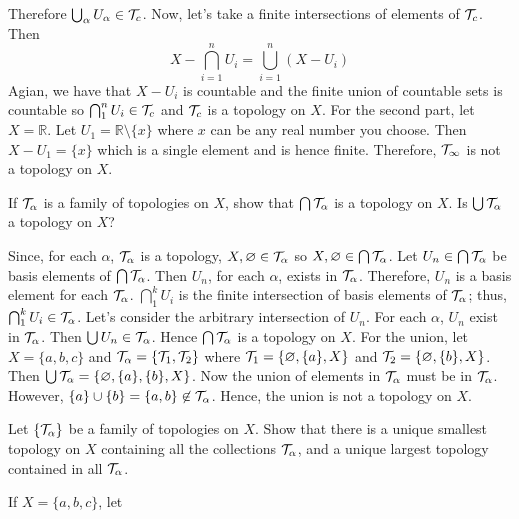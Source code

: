 \begin{exercise}
  Therefore \(\bigcup_{\alpha}U_{\alpha}\in\mathcal{T}_c\).
  Now, let's take a finite intersections of elements of \(\mathcal{T}_c\).
  Then
  \[
  X - \bigcap_{i = 1}^nU_i = \bigcup_{i = 1}^n(X - U_i)
  \]
  Agian, we have that \(X - U_i\) is countable and the finite union of
  countable sets is countable so \(\bigcap_1^nU_i\in\mathcal{T}_c\) and \(\mathcal{T}_c\) is
  a topology on \(X\).
  For the second part, let \(X = \mathbb{R}\).
  Let \(U_1 = \mathbb{R}\setminus\{x\}\) where \(x\) can be any real number you
  choose.
  Then \(X - U_1 = \{x\}\) which is a single element and is hence finite.
  Therefore, \(\mathcal{T}_{\infty}\) is not a topology on \(X\).
\item
  \begin{exercise}[label = (\alph*)]
  \item
    If \(\mathcal{T}_{\alpha}\) is a family of topologies on \(X\), show that
    \(\bigcap\mathcal{T}_{\alpha}\) is a topology on \(X\).
    Is \(\bigcup\mathcal{T}_{\alpha}\) a topology on \(X\)?
    \par\smallskip
    Since, for each \(\alpha\), \(\mathcal{T}_{\alpha}\) is a topology,
    \(X,\varnothing\in\mathcal{T}_{\alpha}\) so
    \(X,\varnothing\in\bigcap\mathcal{T}_{\alpha}\).
    Let \(U_n\in\bigcap\mathcal{T}_{\alpha}\) be basis elements of
    \(\bigcap\mathcal{T}_{\alpha}\).
    Then \(U_n\), for each \(\alpha\), exists in \(\mathcal{T}_{\alpha}\).
    Therefore, \(U_n\) is a basis element for each \(\mathcal{T}_{\alpha}\).
    \(\bigcap_1^kU_i\) is the finite intersection of basis elements of
    \(\mathcal{T}_{\alpha}\); thus, \(\bigcap_1^kU_i\in\mathcal{T}_{\alpha}\).
    Let's consider the arbitrary intersection of \(U_n\).
    For each \(\alpha\), \(U_n\) exist in \(\mathcal{T}_{\alpha}\).
    Then \(\bigcup U_n\in\mathcal{T}_{\alpha}\).
    Hence \(\bigcap\mathcal{T}_{\alpha}\) is a topology on \(X\).
    For the union, let \(X = \{a,b,c\}\) and
    \(\mathcal{T}_{\alpha} = \{\mathcal{T}_1,\mathcal{T}_2\}\) where
    \(\mathcal{T}_1 = \{\varnothing,\{a\},X\}\) and
    \(\mathcal{T}_2 = \{\varnothing,\{b\},X\}\).
    Then \(\bigcup\mathcal{T}_{\alpha} = \{\varnothing,\{a\},\{b\},X\}\).
    Now the union of elements in \(\mathcal{T}_{\alpha}\) must be in
    \(\mathcal{T}_{\alpha}\).
    However, \(\{a\}\cup\{b\} = \{a,b\}\not\in\mathcal{T}_{\alpha}\).
    Hence, the union is not a topology on \(X\).
  \item
    Let \(\{\mathcal{T}_{\alpha}\}\) be a family of topologies on \(X\).
    Show that there is a unique smallest topology on \(X\) containing all the
    collections \(\mathcal{T}_{\alpha}\), and a unique largest topology
    contained in all \(\mathcal{T}_{\alpha}\).
  \item
    If \(X = \{a,b,c\}\), let
    \[
\]
\end{exercise}
\end{exercise}
